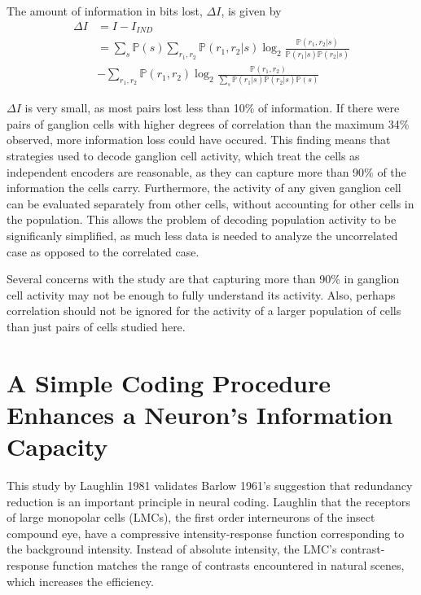 \documentclass[twoside]{article}
\begin{document}
\begin{multicols}{2}
The amount of information in bits lost, $\Delta I$, is given by 
\begin{align}
	\Delta I 
		&= I - I_{IND} \\
		&= \sum_s\mathbb{P}(s) \sum_{r_1,r_2}\mathbb{P}(r_1,r_2|s) \log_2 \frac{\mathbb{P}(r_1,r_2|s)}{\mathbb{P}(r_1|s)\mathbb{P}(r_2|s)} \\
		&- \sum_{r_1,r_2}\mathbb{P}(r_1,r_2) \log_2 \frac{\mathbb{P}(r_1,r_2)}{\sum_s \mathbb{P}(r_1|s)\mathbb{P}(r_2|s) \mathbb{P}(s)} 
\end{align}

$\Delta I$ is very small, as most pairs lost less than 10\% of information. If there were pairs of ganglion cells with higher degrees of correlation than the maximum 34\% observed, more information loss could have occured. This finding means that strategies used to decode ganglion cell activity, which treat the cells as independent encoders are reasonable, as they can capture more than 90\% of the information the cells carry. Furthermore, the activity of any given ganglion cell can be evaluated separately from other cells, without accounting for other cells in the population. This allows the problem of decoding population activity to be significanly simplified, as much less data is needed to analyze the uncorrelated case as opposed to the correlated case. 

Several concerns with the study are that capturing more than 90\% in ganglion cell activity may not be enough to fully understand its activity. Also, perhaps correlation should not be ignored for the activity of a larger population of cells than just pairs of cells studied here. 


\section{A Simple Coding Procedure Enhances a Neuron's Information Capacity}

This study by Laughlin 1981 validates Barlow 1961's suggestion that redundancy reduction is an important principle in neural coding. Laughlin that the receptors of large monopolar cells (LMCs), the first order interneurons of the insect compound eye, have a compressive intensity-response function corresponding to the background intensity. Instead of absolute intensity, the LMC's contrast-response function matches the range of contrasts encountered in natural scenes, which increases the efficiency.


\end{multicols}
\end{document}
